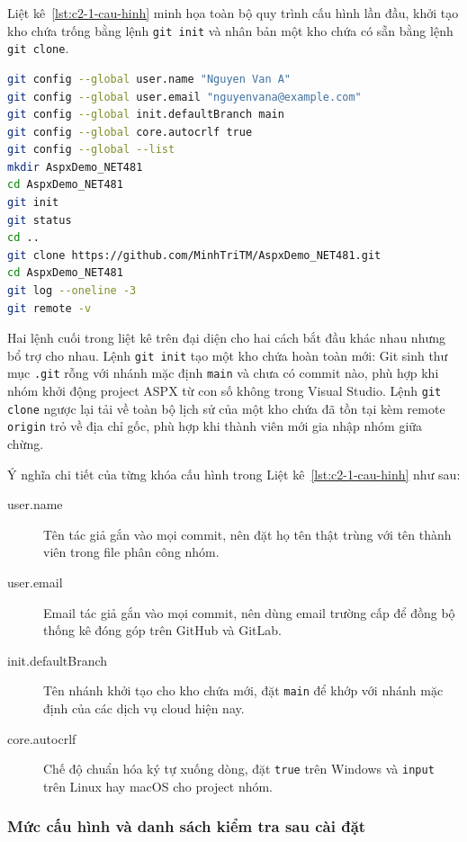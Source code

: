Liệt kê~\ref{lst:c2-1-cau-hinh} minh họa toàn bộ quy trình cấu hình lần đầu, khởi tạo kho chứa trống bằng lệnh \verb|git init| và nhân bản một kho chứa có sẵn bằng lệnh \verb|git clone|.

\begin{lstlisting}[language=bash, caption={Cấu hình đầu tiên, khởi tạo và nhân bản kho chứa}, label={lst:c2-1-cau-hinh}]
git config --global user.name "Nguyen Van A"
git config --global user.email "nguyenvana@example.com"
git config --global init.defaultBranch main
git config --global core.autocrlf true
git config --global --list
mkdir AspxDemo_NET481
cd AspxDemo_NET481
git init
git status
cd ..
git clone https://github.com/MinhTriTM/AspxDemo_NET481.git
cd AspxDemo_NET481
git log --oneline -3
git remote -v
\end{lstlisting}

Hai lệnh cuối trong liệt kê trên đại diện cho hai cách bắt đầu khác nhau nhưng bổ trợ cho nhau. Lệnh \verb|git init| tạo một kho chứa hoàn toàn mới: Git sinh thư mục \texttt{.git} rỗng với nhánh mặc định \texttt{main} và chưa có commit nào, phù hợp khi nhóm khởi động project ASPX từ con số không trong Visual Studio. Lệnh \verb|git clone| ngược lại tải về toàn bộ lịch sử của một kho chứa đã tồn tại kèm remote \texttt{origin} trỏ về địa chỉ gốc, phù hợp khi thành viên mới gia nhập nhóm giữa chừng.

Ý nghĩa chi tiết của từng khóa cấu hình trong Liệt kê~\ref{lst:c2-1-cau-hinh} như sau:

\begin{description}
\item[user.name] Tên tác giả gắn vào mọi commit, nên đặt họ tên thật trùng với tên thành viên trong file phân công nhóm.
\item[user.email] Email tác giả gắn vào mọi commit, nên dùng email trường cấp để đồng bộ thống kê đóng góp trên GitHub và GitLab.
\item[init.defaultBranch] Tên nhánh khởi tạo cho kho chứa mới, đặt \texttt{main} để khớp với nhánh mặc định của các dịch vụ cloud hiện nay.
\item[core.autocrlf] Chế độ chuẩn hóa ký tự xuống dòng, đặt \texttt{true} trên Windows và \texttt{input} trên Linux hay macOS cho project nhóm.
\end{description}

\subsubsection{Mức cấu hình và danh sách kiểm tra sau cài đặt}
\label{subsubsec:c2-1-muc-cau-hinh}

